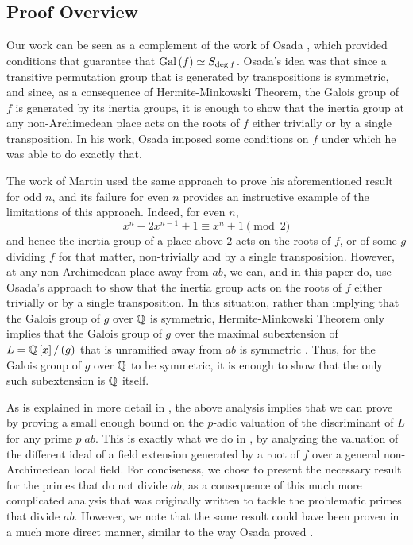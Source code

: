 \documentclass[../main.tex]{subfiles}
\begin{document}
\subsection{Proof Overview}
Our work can be seen as a complement of the work of Osada \cite{Osada1987TheGG}, which provided conditions that guarantee that $\operatorname{Gal}\left( f \right) \simeq S_{\deg f}$.
Osada's idea was that since a transitive permutation group that is generated by transpositions is symmetric, and since, as a consequence of Hermite-Minkowski Theorem, the Galois group of $f$ is generated by its inertia groups, it is enough to show that the inertia group at any non-Archimedean place acts on the roots of $f$ either trivially or by a single transposition.
In his work, Osada imposed some conditions on $f$ under which he was able to do exactly that.

The work of Martin \cite{MARTIN2004213} used the same approach to prove his aforementioned result for odd $n$, and its failure for even $n$ provides an instructive example of the limitations of this approach.
Indeed, for even $n$, 
\[
  x^n - 2x^{n-1} + 1 \equiv x^n + 1 \pmod{2}
\] 
and hence the inertia group of a place above $2$ acts on the roots of $f$, or of some $g$ dividing $f$ for that matter, non-trivially and by a single transposition. 
However, at any non-Archimedean place away from $ab$, we can, and in this paper do, use Osada's approach to show that the inertia group acts on the roots of $f$ either trivially or by a single transposition.
In this situation, rather than implying that the Galois group of $g$ over $\mathbb{Q}$ is symmetric, Hermite-Minkowski Theorem only implies that the Galois group of $g$ over the maximal subextension of $L = \mathbb{Q}\left[ x \right] / \left( g \right)$ that is unramified away from $ab$ is symmetric .
Thus, for the Galois group of $g$ over $\mathbb{Q}$ to be symmetric, it is enough to show that the only such subextension is $\mathbb{Q}$ itself.

As is explained in more detail in , the above analysis implies that we can prove  by proving a small enough bound on the $p$-adic valuation of the discriminant of $L$ for any prime $p | ab$.
This is exactly what we do in , by analyzing the valuation of the different ideal of a field extension generated by a root of $f$ over a general non-Archimedean local field.
For conciseness, we chose to present the necessary result for the primes that do not divide $ab$, as a consequence of this much more complicated analysis that was originally written to tackle the problematic primes that divide $ab$.
However, we note that the same result could have been proven in a much more direct manner, similar to the way Osada proved \cite[Lemma 3]{Osada1987TheGG}.
\end{document}
